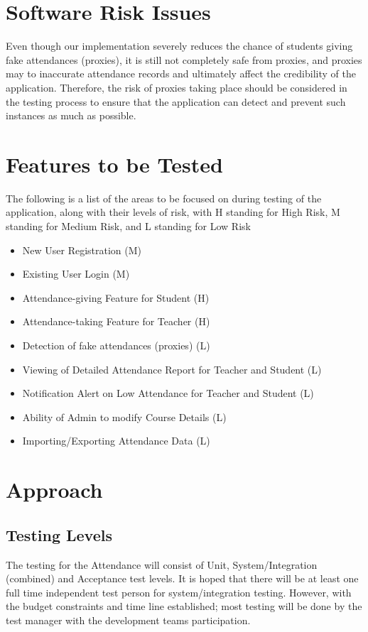 \documentclass{scrreprt}
\begin{document}
\chapter{Software Risk Issues}
Even though our implementation severely reduces the chance of students giving fake attendances (proxies), it is still not completely safe from proxies,  and proxies may to inaccurate attendance records and ultimately affect the credibility of the application. Therefore, the risk of proxies taking place should be considered in the testing process to ensure that the application can detect and prevent such instances as much as possible.

\chapter{Features to be Tested}
The following is a list of the areas to be focused on during testing of the application, along with their levels of risk, with H standing for High Risk, M standing for Medium Risk, and L standing for Low Risk 
\begin{itemize}
\item New User Registration (M)
\item Existing User Login (M)
\item Attendance-giving Feature for Student (H)
\item Attendance-taking Feature for Teacher (H)
\item Detection of fake attendances (proxies) (L)
\item Viewing of Detailed Attendance Report for Teacher and Student (L)
\item Notification Alert on Low Attendance for Teacher and Student (L)
\item Ability of Admin to modify Course Details (L)
\item Importing/Exporting Attendance Data (L)
\end{itemize}

\chapter{Approach}

\section{Testing Levels}
The testing for the Attendance will consist of Unit, System/Integration (combined) and Acceptance test levels. It is hoped that there will be at least one full time independent test person for system/integration testing. However, with the budget constraints and time line established; most testing will be done by the test manager with the development teams participation.
\end{document}
